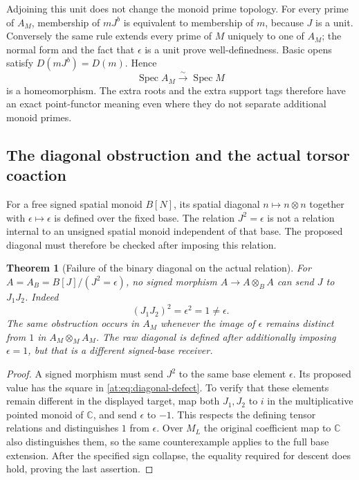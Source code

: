 \documentclass[11pt,a4paper]{article}
\newtheorem{theorem}{Theorem}[section]
\theoremstyle{definition}\newtheorem{definition}[theorem]{Definition}
\newcommand{\C}{\mathbb C}\newcommand{\R}{\mathbb R}
\newcommand{\Spec}{\operatorname{Spec}}\newcommand{\SpecMon}{\operatorname{Spec}_{\mathrm{mon}}}
\begin{document}
Adjoining this unit does not change the monoid prime topology.
For every prime of $A_M$, membership of $mJ^b$ is equivalent to
membership of $m$, because $J$ is a unit. Conversely the same
rule extends every prime of $M$ uniquely to one of $A_M$;
the normal form and the fact that $\epsilon$ is a unit prove
well-definedness. Basic opens satisfy $D(mJ^b)=D(m)$. Hence
\[
 \Spec A_M\xrightarrow{\sim}\Spec M
 \tag{AT9}\label{at:eq:spectrum-root}
\]
is a homeomorphism. The extra roots and the extra support tags
therefore have an exact point-functor meaning even where they
do not separate additional monoid primes.

\subsection{The diagonal obstruction and the actual torsor coaction}

For a free signed spatial monoid $B[N]$, its spatial diagonal
$n\mapsto n\otimes n$ together with $\epsilon\mapsto\epsilon$
is defined over the fixed base. The relation $J^2=\epsilon$ is
not a relation internal to an unsigned spatial monoid independent
of that base. The proposed diagonal must therefore be checked
after imposing this relation.

\begin{theorem}[Failure of the binary diagonal on the actual relation]
\label{at:thm:diagonal-failure}
For $A=A_B=B[J]/(J^2=\epsilon)$, no signed morphism
$A\to A\otimes_BA$ can send $J$ to $J_1J_2$.
Indeed
\[
 (J_1J_2)^2=\epsilon^2=1\ne\epsilon.
 \tag{AT10}\label{at:eq:diagonal-defect}
\]
The same obstruction occurs in $A_M$ whenever the image of
$\epsilon$ remains distinct from $1$ in $A_M\otimes_MA_M$.
The raw diagonal is defined after additionally imposing
$\epsilon=1$, but that is a different signed-base receiver.
\end{theorem}
\begin{proof}
A signed morphism must send $J^2$ to the same base element
$\epsilon$. Its proposed value has the square in
\eqref{at:eq:diagonal-defect}. To verify that these elements remain
different in the displayed target, map both $J_1,J_2$ to $i$
in the multiplicative pointed monoid of $\C$, and send
$\epsilon$ to $-1$. This respects the defining tensor relations
and distinguishes $1$ from $\epsilon$. Over $M_L$ the original
coefficient map to $\C$ also distinguishes them, so the same
counterexample applies to the full base extension. After the
specified sign collapse, the equality required for descent
does hold, proving the last assertion.
\end{proof}
\end{document}
